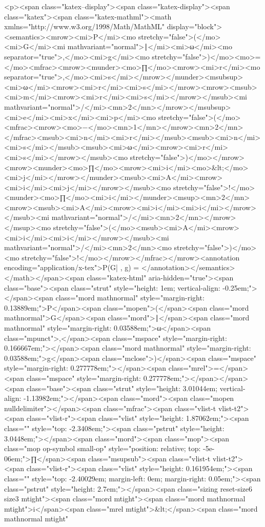 <p><span class="katex--display"><span class="katex-display"><span class="katex"><span class="katex-mathml"><math xmlns="http://www.w3.org/1998/Math/MathML" display="block"><semantics><mrow><mi>P</mi><mo stretchy="false">(</mo><mi>G</mi><mi mathvariant="normal">∣</mi><mi>ω</mi><mo separator="true">,</mo><mi>g</mi><mo stretchy="false">)</mo><mo>=</mo><mfrac><mrow><munder><mo>∏</mo><mrow><mi>r</mi><mo separator="true">,</mo><mi>s</mi></mrow></munder><msubsup><mi>ω</mi><mrow><mi>r</mi><mi>s</mi></mrow><mrow><msub><mi>m</mi><mrow><mi>r</mi><mi>s</mi></mrow></msub><mi mathvariant="normal">/</mi><mn>2</mn></mrow></msubsup><mi>e</mi><mi>x</mi><mi>p</mi><mo stretchy="false">(</mo><mfrac><mrow><mo>−</mo><mn>1</mn></mrow><mn>2</mn></mfrac><msub><mi>n</mi><mi>r</mi></msub><msub><mi>n</mi><mi>s</mi></msub><msub><mi>ω</mi><mrow><mi>r</mi><mi>s</mi></mrow></msub><mo stretchy="false">)</mo></mrow><mrow><munder><mo>∏</mo><mrow><mi>i</mi><mo>&lt;</mo><mi>j</mi></mrow></munder><msub><mi>A</mi><mrow><mi>i</mi><mi>j</mi></mrow></msub><mo stretchy="false">!</mo><munder><mo>∏</mo><mi>i</mi></munder><msup><mn>2</mn><mrow><msub><mi>A</mi><mrow><mi>i</mi><mi>i</mi></mrow></msub><mi mathvariant="normal">/</mi><mn>2</mn></mrow></msup><mo stretchy="false">(</mo><msub><mi>A</mi><mrow><mi>i</mi><mi>i</mi></mrow></msub><mi mathvariant="normal">/</mi><mn>2</mn><mo stretchy="false">)</mo><mo stretchy="false">!</mo></mrow></mfrac></mrow><annotation encoding="application/x-tex">P(G| \omega, g) =  </annotation></semantics></math></span><span class="katex-html" aria-hidden="true"><span class="base"><span class="strut" style="height: 1em; vertical-align: -0.25em;"></span><span class="mord mathnormal" style="margin-right: 0.13889em;">P</span><span class="mopen">(</span><span class="mord mathnormal">G</span><span class="mord">∣</span><span class="mord mathnormal" style="margin-right: 0.03588em;">ω</span><span class="mpunct">,</span><span class="mspace" style="margin-right: 0.166667em;"></span><span class="mord mathnormal" style="margin-right: 0.03588em;">g</span><span class="mclose">)</span><span class="mspace" style="margin-right: 0.277778em;"></span><span class="mrel">=</span><span class="mspace" style="margin-right: 0.277778em;"></span></span><span class="base"><span class="strut" style="height: 3.01044em; vertical-align: -1.13982em;"></span><span class="mord"><span class="mopen nulldelimiter"></span><span class="mfrac"><span class="vlist-t vlist-t2"><span class="vlist-r"><span class="vlist" style="height: 1.87062em;"><span class="" style="top: -2.3408em;"><span class="pstrut" style="height: 3.0448em;"></span><span class="mord"><span class="mop"><span class="mop op-symbol small-op" style="position: relative; top: -5e-06em;">∏</span><span class="msupsub"><span class="vlist-t vlist-t2"><span class="vlist-r"><span class="vlist" style="height: 0.161954em;"><span class="" style="top: -2.40029em; margin-left: 0em; margin-right: 0.05em;"><span class="pstrut" style="height: 2.7em;"></span><span class="sizing reset-size6 size3 mtight"><span class="mord mtight"><span class="mord mathnormal mtight">i</span><span class="mrel mtight">&lt;</span><span class="mord mathnormal mtight" 